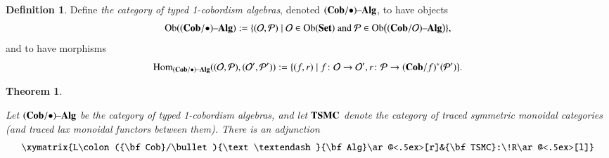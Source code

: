 \documentclass{amsart}
\def\tn{\textnormal}
\def\mc{\mathcal}
\def\Hom{\tn{Hom}}
\def\Ob{\tn{Ob}}
\def\to{\rightarrow}
\def\taking{\colon}
\def\|{{\;|\;}}
\def\Cob{{\bf Cob}}
\def\Set{{\bf Set}}
\def\alg{{\text \textendash}{\bf Alg}}
\def\mcO{\mc{O}}
\def\mcP{\mc{P}}
\def\TSMC{{\bf TSMC}}
\newtheorem{theorem}[subsubsection]{Theorem}
\theoremstyle{remark}
\theoremstyle{definition}
\newtheorem{definition}[subsubsection]{Definition}
\begin{document}
\begin{definition}

Define {\em the category of typed 1-cobordism algebras}, denoted $(\Cob/\bullet)\alg$, to have objects 
$$\Ob((\Cob/\bullet)\alg):=\{(\mcO,\mcP)\|\mcO\in\Ob(\Set)\tn{ and } \mcP\in\Ob\big((\Cob/\mcO)\alg\big)\},$$
and to have morphisms
$$\Hom_{(\Cob/\bullet)\alg}((\mcO,\mcP),(\mcO',\mcP')):=\{(f,r)\|f\taking\mcO\to\mcO', r\taking\mcP\to(\Cob/f)^*(\mcP')\}.$$

\end{definition}

\begin{theorem}\label{thm:cobalg trace adjunction}

Let $(\Cob/\bullet)\alg$ be the category of typed 1-cobordism algebras, and let $\TSMC$ denote the category of traced symmetric monoidal categories (and traced lax monoidal functors between them). There is an adjunction
$$\xymatrix{L\taking(\Cob/\bullet)\alg\ar@<.5ex>[r]&\TSMC:\!R\ar@<.5ex>[l]}$$

\end{theorem}
\end{document}
